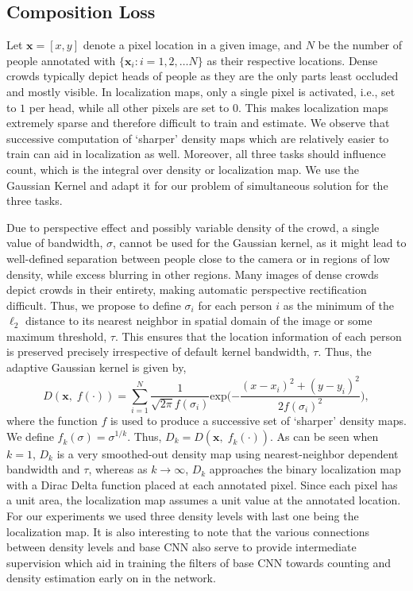 \documentclass[runningheads]{llncs}
\begin{document}
\subsection{Composition Loss}
Let $\mathbf{x} = [x,y]$ denote a pixel location in a given image, and $N$ be the number of people annotated with $\{\mathbf{x}_i : i = 1,2,\ldots N\}$ as their respective locations. Dense crowds typically depict heads of people as they are the only parts least occluded and mostly visible. In localization maps, only a single pixel is activated, i.e., set to $1$ per head, while all other pixels are set to $0$. This makes localization maps extremely sparse and therefore difficult to train and estimate. We observe that successive computation of `sharper' density maps which are relatively easier to train can aid in localization as well. Moreover, all three tasks should influence count, which is the integral over density or localization map. We use the Gaussian Kernel and adapt it for our problem of simultaneous solution for the three tasks.

Due to perspective effect and possibly variable density of the crowd, a single value of bandwidth, $\sigma$, cannot be used for the Gaussian kernel, as it might lead to well-defined separation between people close to the camera or in regions of low density, while excess blurring in other regions. Many images of dense crowds depict crowds in their entirety, making automatic perspective rectification difficult. Thus, we propose to define $\sigma_i$ for each person $i$ as the minimum of the $\ell_2$ distance to its nearest neighbor in spatial domain of the image or some maximum threshold, $\tau$. This ensures that the location information of each person is preserved precisely irrespective of default kernel bandwidth, $\tau$. Thus, the adaptive Gaussian kernel is given by,
\begin{equation}
D(\mathbf{x,\; \textit{f}(\cdot)}) = \sum_{i=1}^{N} \frac{1}{{ \sqrt {2\pi } \textit{f}(\sigma_i) }} \mathrm{exp}\bigg({{{ - \frac{ (x - x_i)^2 + (y - y_i)^2 } {2 \textit{f}(\sigma_i) ^2 }}}}\bigg),
\end{equation}
where the function $\textit{f}$ is used to produce a successive set of `sharper' density maps. We define $\textit{f}_k(\sigma)=\sigma^{1/k}$. Thus, $D_k = D(\mathbf{x},\; \textit{f}_k(\cdot))$. As can be seen when $k=1$, $D_k$ is a very smoothed-out density map using nearest-neighbor dependent bandwidth and $\tau$, whereas as $k\longrightarrow \infty$, $D_k$ approaches the binary localization map with a Dirac Delta function placed at each annotated pixel. Since each pixel has a unit area, the localization map assumes a unit value at the annotated location. For our experiments we used three density levels with last one being the localization map. It is also interesting to note that the various connections between density levels and base CNN also serve to provide intermediate supervision which aid in training the filters of base CNN towards counting and density estimation early on in the network.
\end{document}
